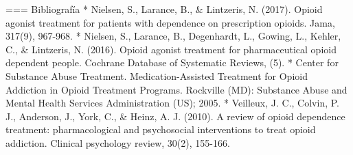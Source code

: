 === Bibliografía
* Nielsen, S., Larance, B., \& Lintzeris, N. (2017). Opioid agonist treatment for patients with dependence on prescription opioids. Jama, 317(9), 967-968.
* Nielsen, S., Larance, B., Degenhardt, L., Gowing, L., Kehler, C., \& Lintzeris, N. (2016). Opioid agonist treatment for pharmaceutical opioid dependent people. Cochrane Database of Systematic Reviews, (5).
* Center for Substance Abuse Treatment. Medication-Assisted Treatment for Opioid Addiction in Opioid Treatment Programs. Rockville (MD): Substance Abuse and Mental Health Services Administration (US); 2005.
* Veilleux, J. C., Colvin, P. J., Anderson, J., York, C., \& Heinz, A. J. (2010). A review of opioid dependence treatment: pharmacological and psychosocial interventions to treat opioid addiction. Clinical psychology review, 30(2), 155-166.
